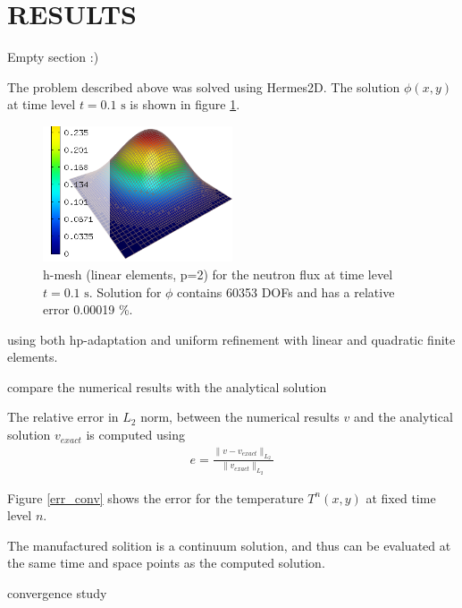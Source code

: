 \section*{RESULTS}
Empty section :)

The problem described above was solved using Hermes2D.  The solution $\phi(x,y)$ at time level $t=0.1 \mbox{ s}$ is shown in figure \ref{sol_temp}.

\begin{figure}
  \includegraphics[width=0.5\textwidth]{figures/solution_T}
  \caption{h-mesh (linear elements, p=2) for the neutron flux at time level $t=0.1 \mbox{ s}$.  Solution for $\phi$ contains 60353 DOFs and has a relative error 0.00019 \%.}
  \label{sol_temp}
\end{figure}

using both hp-adaptation and uniform refinement with linear and quadratic finite elements.

compare the numerical results with the analytical solution

The relative error in $L_2$ norm, between the numerical results $v$ and the analytical solution $v_{exact}$ is computed using
\begin{align}
  e = \frac{ \|v-v_{exact}\|_{L_2} }{ \|v_{exact}\|_{L_2} }
\end{align}

Figure \ref{err_conv} shows the error for the temperature $T^{n}(x,y)$ at fixed time level $n$.


The manufactured solition is a continuum solution, and thus can be evaluated at the same time and space points as the computed solution.

convergence study

